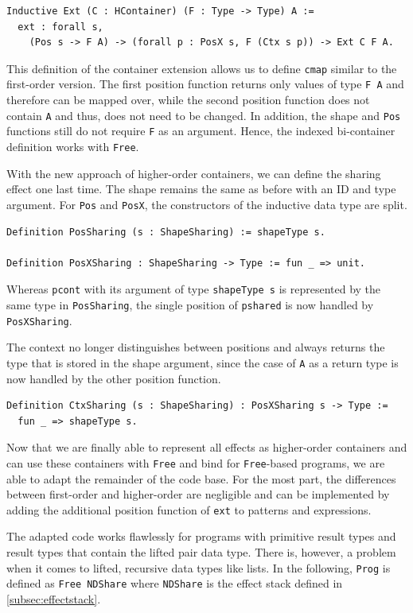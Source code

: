 \documentclass[a4paper, 11pt, fleqn, twoside, abstract=on]{scrreprt}
\newcommand{\cinl}[1]{\texttt{#1}}
\begin{document}
\begin{verbatim}
Inductive Ext (C : HContainer) (F : Type -> Type) A :=
  ext : forall s, 
    (Pos s -> F A) -> (forall p : PosX s, F (Ctx s p)) -> Ext C F A.
\end{verbatim}

This definition of the container extension allows us to define \cinl{cmap} similar to the first-order version.
The first position function returns only values of type \cinl{F A} and therefore can be mapped over, while the second position function does not contain \cinl{A} and thus, does not need to be changed.
In addition, the shape and \cinl{Pos} functions still do not require \cinl{F} as an argument.
Hence, the indexed bi-container definition works with \cinl{Free}.

With the new approach of higher-order containers, we can define the sharing effect one last time.
The shape remains the same as before with an ID and type argument.
For \cinl{Pos} and \cinl{PosX}, the constructors of the inductive data type are split.

\begin{verbatim}
Definition PosSharing (s : ShapeSharing) := shapeType s.

Definition PosXSharing : ShapeSharing -> Type := fun _ => unit.
\end{verbatim}
\noindent
Whereas \cinl{pcont} with its argument of type \cinl{shapeType s} is represented by the same type in \cinl{PosSharing}, the single position of \cinl{pshared} is now handled by \cinl{PosXSharing}.

The context no longer distinguishes between positions and always returns the type that is stored in the shape argument, since the case of \cinl{A} as a return type is now handled by the other position function.
\begin{verbatim}
Definition CtxSharing (s : ShapeSharing) : PosXSharing s -> Type :=
  fun _ => shapeType s.
\end{verbatim}

Now that we are finally able to represent all effects as higher-order containers and can use these containers with \cinl{Free} and bind for \cinl{Free}-based programs, we are able to adapt the remainder of the code base.
For the most part, the differences between first-order and higher-order are negligible and can be implemented by adding the additional position function of \cinl{ext} to patterns and expressions.

The adapted code works flawlessly for programs with primitive result types and result types that contain the lifted pair data type.
There is, however, a problem when it comes to lifted, recursive data types like lists.
In the following, \cinl{Prog} is defined as \cinl{Free NDShare} where \cinl{NDShare} is the effect stack defined in \autoref{subsec:effectstack}.
\end{document}
